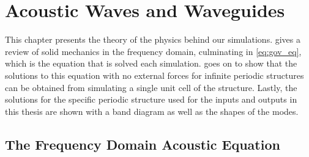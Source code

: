 \chapter{Acoustic Waves and Waveguides}

This chapter presents the theory of the physics behind our simulations.
 gives a review of solid mechanics in the frequency domain,
culminating in \cref{eq:gov_eq}, which is the equation that is solved each
simulation.
 goes on to show that the solutions to this equation with no
external forces for infinite periodic structures can be obtained from simulating
a single unit cell of the structure.
Lastly, the solutions for the specific periodic structure used for the inputs
and outputs in this thesis are shown with a band diagram as well as the shapes of
the modes.

\section{The Frequency Domain Acoustic Equation}\label{sec:acoustics}

